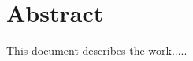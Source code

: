 \cleardoublepage
{}
{}
\begingroup
\let\clearpage\relax
\let\cleardoublepage\relax
\let\cleardoublepage\relax

\chapter*{Abstract}

This document describes the work.....



\endgroup

\vfill
